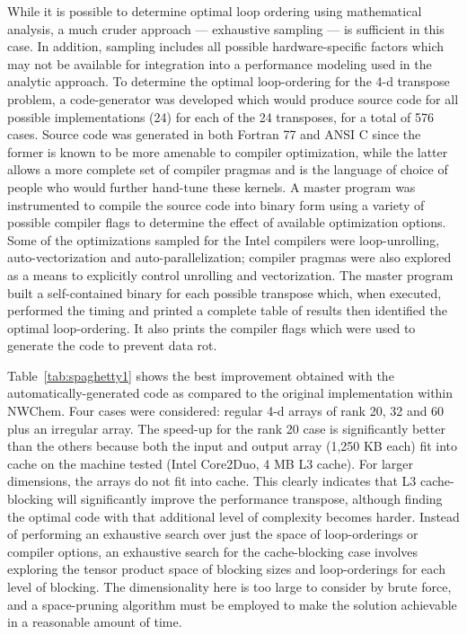 \documentclass[aps,preprint,groupedaddress]{revtex4-1}
\begin{document}
While it is possible to determine optimal loop ordering using mathematical analysis, a much cruder approach --- exhaustive sampling --- is sufficient in this case.  In addition, sampling includes all possible hardware-specific factors which may not be available for integration into a performance modeling used in the analytic approach.  To determine the optimal loop-ordering for the 4-d transpose problem, a code-generator was developed which would produce source code for all possible implementations (24) for each of the 24 transposes, for a total of 576 cases.  Source code was generated in both Fortran 77 and ANSI C since the former is known to be more amenable to compiler optimization, while the latter allows a more complete set of compiler pragmas and is the language of choice of people who would further hand-tune these kernels.  A master program was instrumented to compile the source code into binary form using a variety of possible compiler flags to determine the effect of available optimization options.  Some of the optimizations sampled for the Intel compilers were loop-unrolling, auto-vectorization and auto-parallelization; compiler pragmas were also explored as a means to explicitly control unrolling and vectorization.  The master program built a self-contained binary for each possible transpose which, when executed, performed the timing and printed a complete table of results then identified the optimal loop-ordering.  It also prints the compiler flags which were used to generate the code to prevent data rot.

Table~\ref{tab:spaghetty1} shows the best improvement obtained with the automatically-generated code as compared to the original implementation within NWChem.  Four cases were considered: regular 4-d arrays of rank 20, 32 and 60 plus an irregular array.  The speed-up for the rank 20 case is significantly better than the others because both the input and output array (1,250 KB each) fit into cache on the machine tested (Intel Core2Duo, 4 MB L3 cache).  For larger dimensions, the arrays do not fit into cache.  This clearly indicates that L3 cache-blocking will significantly improve the performance transpose, although finding the optimal code with that additional level of complexity becomes harder.  Instead of performing an exhaustive search over just the space of loop-orderings or compiler options, an exhaustive search for the cache-blocking case involves exploring the tensor product space of blocking sizes and loop-orderings for each level of blocking.  The dimensionality here is too large to consider by brute force, and a space-pruning algorithm must be employed to make the solution achievable in a reasonable amount of time.
\end{document}
